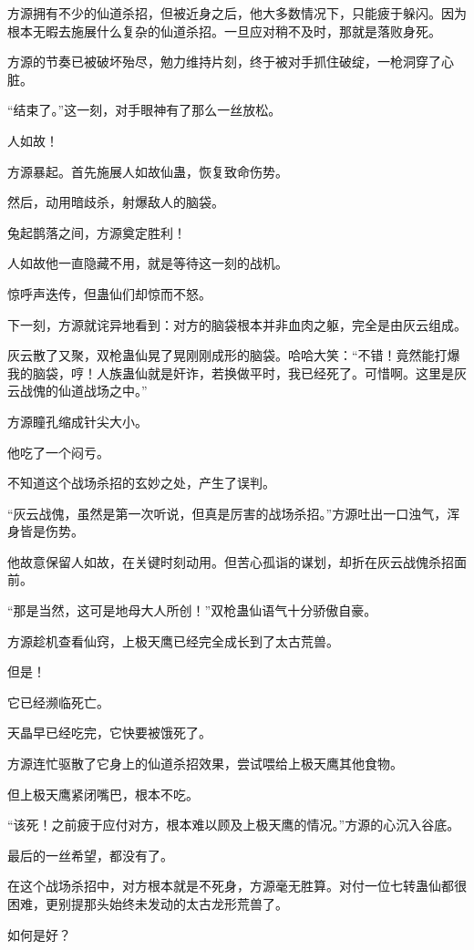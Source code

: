 \begin{this_body}
方源拥有不少的仙道杀招，但被近身之后，他大多数情况下，只能疲于躲闪。因为根本无暇去施展什么复杂的仙道杀招。一旦应对稍不及时，那就是落败身死。

方源的节奏已被破坏殆尽，勉力维持片刻，终于被对手抓住破绽，一枪洞穿了心脏。

“结束了。”这一刻，对手眼神有了那么一丝放松。

人如故！

方源暴起。首先施展人如故仙蛊，恢复致命伤势。

然后，动用暗歧杀，射爆敌人的脑袋。

兔起鹊落之间，方源奠定胜利！

人如故他一直隐藏不用，就是等待这一刻的战机。

惊呼声迭传，但蛊仙们却惊而不怒。

下一刻，方源就诧异地看到：对方的脑袋根本并非血肉之躯，完全是由灰云组成。

灰云散了又聚，双枪蛊仙晃了晃刚刚成形的脑袋。哈哈大笑：“不错！竟然能打爆我的脑袋，哼！人族蛊仙就是奸诈，若换做平时，我已经死了。可惜啊。这里是灰云战傀的仙道战场之中。”

方源瞳孔缩成针尖大小。

他吃了一个闷亏。

不知道这个战场杀招的玄妙之处，产生了误判。

“灰云战傀，虽然是第一次听说，但真是厉害的战场杀招。”方源吐出一口浊气，浑身皆是伤势。

他故意保留人如故，在关键时刻动用。但苦心孤诣的谋划，却折在灰云战傀杀招面前。

“那是当然，这可是地母大人所创！”双枪蛊仙语气十分骄傲自豪。

方源趁机查看仙窍，上极天鹰已经完全成长到了太古荒兽。

但是！

它已经濒临死亡。

天晶早已经吃完，它快要被饿死了。

方源连忙驱散了它身上的仙道杀招效果，尝试喂给上极天鹰其他食物。

但上极天鹰紧闭嘴巴，根本不吃。

“该死！之前疲于应付对方，根本难以顾及上极天鹰的情况。”方源的心沉入谷底。

最后的一丝希望，都没有了。

在这个战场杀招中，对方根本就是不死身，方源毫无胜算。对付一位七转蛊仙都很困难，更别提那头始终未发动的太古龙形荒兽了。

如何是好？


\end{this_body}
